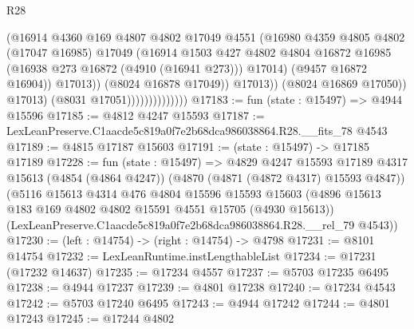 \begin{lexlean}{R28}
\begin{coremodule}
                                          (@16914
                                            @4360
                                            @169
                                            @4807
                                            @4802
                                            @17049
                                            @4551
                                            (@16980
                                              @4359
                                              @4805
                                              @4802
                                              (@17047 @16985)
                                              @17049
                                              (@16914
                                                @1503
                                                @427
                                                @4802
                                                @4804
                                                @16872
                                                @16985
                                                (@16938 @273 @16872 (@4910 (@16941 @273)))
                                                @17014)
                                              (@9457 @16872 @16904))
                                            @17013))
                                        (@8024 @16878 @17049))
                                      @17013))
                                  (@8024 @16869 @17050))
                                @17013)
                              (@8031 @17051))))))))))))))
@17183 := fun (state : @15497) => @4944 @15596
@17185 := @4812 @4247 @15593
@17187 := LexLeanPreserve.C1aacde5c819a0f7e2b68dca986038864.R28.__fits_78 @4543
@17189 := @4815 @17187 @15603
@17191 := (state : @15497) -> @17185 @17189
@17228 := fun (state : @15497) =>
  @4829
    @4247
    @15593
    @17189
    @4317
    @15613
    (@4854 (@4864 @4247))
    (@4870 (@4871 (@4872 @4317) @15593 @4847))
    (@5116
      @15613
      @4314
      @476
      @4804
      @15596
      @15593
      @15603
      (@4896 @15613 @183 @169 @4802 @4802 @15591 @4551 @15705 (@4930 @15613))
      (LexLeanPreserve.C1aacde5c819a0f7e2b68dca986038864.R28.__rel_79 @4543))
@17230 := (left : @14754) -> (right : @14754) -> @4798
@17231 := @8101 @14754
@17232 := LexLeanRuntime.instLengthableList
@17234 := @17231 (@17232 @14637)
@17235 := @17234 @4557
@17237 := @5703 @17235 @6495
@17238 := @4944 @17237
@17239 := @4801 @17238
@17240 := @17234 @4543
@17242 := @5703 @17240 @6495
@17243 := @4944 @17242
@17244 := @4801 @17243
@17245 := @17244 @4802

\end{coremodule}
\end{lexlean}
